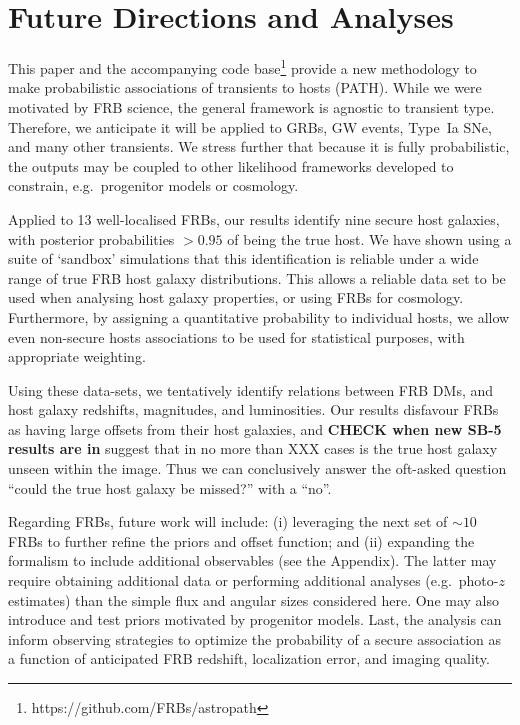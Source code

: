 \documentclass[twocolumn,linenumbers]{aastex63}
\begin{document}




\section{Future Directions and Analyses}
\label{sec:future}

This paper and the accompanying code base\footnote{https://github.com/FRBs/astropath}
provide a new methodology to make probabilistic associations of transients
to hosts (PATH).  While we were motivated by FRB science, the general
framework is agnostic to transient type.  Therefore, we anticipate
it will be applied to GRBs, GW events, Type~Ia SNe, and many other
transients.  We stress further that because it is fully probabilistic,
the outputs may be coupled to other likelihood frameworks developed
to constrain, e.g.\ progenitor models or cosmology.

Applied to 13 well-localised FRBs, our results identify nine secure
host galaxies, with posterior probabilities $>0.95$ of being the true host.
We have shown using a suite of `sandbox' simulations that this identification is reliable under a wide range of true FRB host galaxy distributions. This allows a reliable data set to be used when analysing host galaxy properties, or using FRBs for cosmology. Furthermore, by assigning a quantitative probability to individual hosts, we allow even non-secure hosts associations to be used for statistical purposes, with appropriate weighting.

Using these data-sets, we tentatively identify relations between FRB DMs, and host galaxy redshifts, magnitudes, and luminosities. Our results disfavour FRBs as having large offsets from their host galaxies, and {\bf CHECK when new SB-5 results are in} suggest that in no more than XXX cases is the true host galaxy unseen within the image. Thus we can conclusively answer the oft-asked question ``could the true host galaxy be missed?'' with a ``no''.

Regarding FRBs, future work will include:
 (i) leveraging the next set of $\sim 10$ FRBs to further refine the
 priors and offset function; 
 and 
 (ii) expanding the formalism to include additional observables
 (see the Appendix).
The latter may require obtaining additional data or performing
additional analyses (e.g.\ photo-$z$ estimates) than the 
simple flux and angular sizes considered here.
One may also introduce and test priors motivated by
progenitor models.
Last, the analysis can inform observing strategies to optimize
the probability of a secure association as a function of anticipated
FRB redshift, localization error, and imaging quality.
\end{document}
